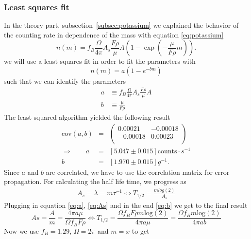 \subsubsection{Least squares fit}
In the theory part, subsection~\ref{subsec:potassium} we explained the 
behavior of the counting rate in dependence of the mass with
equation \eqref{eq:potassium}
\begin{equation*}
n(m) = f_B \frac{\Omega}{4 \pi} A_s \frac{F \rho }{\mu}A \left (1 - \exp \left ( - \frac{\mu}{F \rho}m \right ) \right ).
\end{equation*}
we will use a least squares fit in order to fit the parameters with
\begin{equation}
n(m) = a ( 1 - e^{-bm})
\end{equation}
such that we can identify the parameters
\begin{align}
a &\equiv  f_B \frac{\Omega}{4 \pi} A_s \frac{F \rho }{\mu}A  \label{eq:a}\\ 
b &\equiv \frac{\mu}{F \rho} \label{eq:b}
\end{align}
The least squared algorithm yielded the following result
\begin{eqnarray}
    \mathrm{cov}(a,b) &=& 
    \begin{pmatrix}
        0.00021 &-0.00018 \\
        -0.00018 &0.00023 \\
    \end{pmatrix}\\
 \Rightarrow \qquad
    a &=& \left [ 5.047 \pm 0.015 \right ] \text{counts} \cdot s^{-1} \\
    b &=& \left [ 1.970 \pm 0.015 \right ] g^{-1}. 
\end{eqnarray}
Since $a$ and $b$ are correlated, we have to use the correlation matrix for
error propagation. For calculating the half life time, we progress as
\begin{align}
A_s = \lambda = m \tau ^{-1} \Leftrightarrow  T_{1/2} = \frac{m log(2)}{A_s}
\label{eq:As}
\end{align}
Plugging in equation \eqref{eq:a}, \eqref{eq:As} and in the end \eqref{eq:b} we get to the final result
\begin{equation}
As = \frac{A}{m} =  \frac{4 \pi a \mu}{\Omega f_B F \rho} \Leftrightarrow T_{1/2} = \frac{\Omega f_B F \rho m \mathrm{log}(2)}{4 \pi a \mu} 
= \frac{\Omega f_B m \mathrm{log}(2)}{4 \pi a b}
\end{equation}
Now we use $f_B=1.29$, $\Omega = 2 \pi$ and $m = x$ to get 
\begin{equation}
\end{equation}

